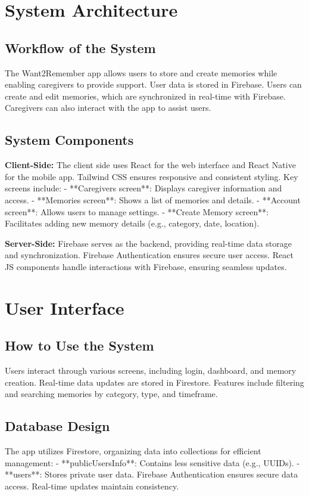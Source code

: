 \documentclass{article}
\begin{document}
\section{System Architecture}
\subsection{Workflow of the System}
The Want2Remember app allows users to store and create memories while enabling caregivers to provide support. User data is stored in Firebase. Users can create and edit memories, which are synchronized in real-time with Firebase. Caregivers can also interact with the app to assist users.

\subsection{System Components}
\textbf{Client-Side:} 
The client side uses React for the web interface and React Native for the mobile app. Tailwind CSS ensures responsive and consistent styling. Key screens include:
- **Caregivers screen**: Displays caregiver information and access.
- **Memories screen**: Shows a list of memories and details.
- **Account screen**: Allows users to manage settings.
- **Create Memory screen**: Facilitates adding new memory details (e.g., category, date, location).

\textbf{Server-Side:} 
Firebase serves as the backend, providing real-time data storage and synchronization. Firebase Authentication ensures secure user access. React JS components handle interactions with Firebase, ensuring seamless updates.

\section{User Interface}
\subsection{How to Use the System}
Users interact through various screens, including login, dashboard, and memory creation. Real-time data updates are stored in Firestore. Features include filtering and searching memories by category, type, and timeframe.

\subsection{Database Design}
The app utilizes Firestore, organizing data into collections for efficient management:
- **publicUsersInfo**: Contains less sensitive data (e.g., UUIDs).
- **users**: Stores private user data.
Firebase Authentication ensures secure data access. Real-time updates maintain consistency.
\end{document}
